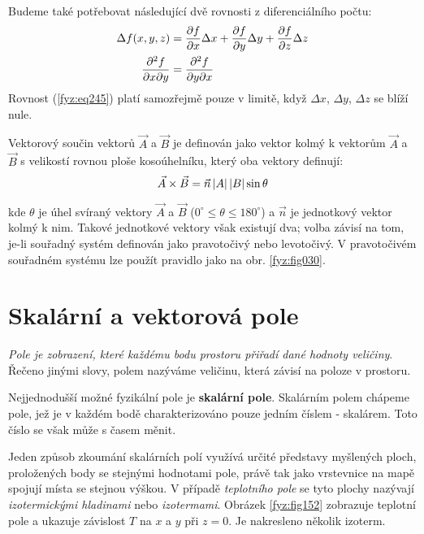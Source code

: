     Budeme také potřebovat následující dvě rovnosti z dife\-ren\-ci\-ál\-ní\-ho počtu:
    \begin{subequations} 
      \begin{align} 
        \Delta f(x,y,z)                      
          &=  \dfrac{\partial f}{\partial x}\Delta x +
              \dfrac{\partial f}{\partial y}\Delta y + 
              \dfrac{\partial f}{\partial z}\Delta z                     \label{fyz:eq245}        \\
        \frac{\partial^2f}{\partial x\partial y}
          &=\frac{\partial^2f}{\partial y\partial x}  \label{fyz:eq246}
      \end{align}
    \end{subequations}
    Rovnost (\ref{fyz:eq245}) platí samozřejmě pouze v limitě, když \(\Delta x\), \(\Delta 
    y\), \(\Delta z\) se blíží nule.
   
    Vektorový součin vektorů $\vec{A}$ a $\vec{B}$ je definován jako vektor kolmý k vektorům 
    $\vec{A}$ a $\vec{B}$ s velikostí rovnou ploše kosoúhelníku, který oba vektory definují:
    \begin{equation}\label{fyz:eq247}
      \vec{A}\times\vec{B} = \vec{n}\left\lvert A\right\rvert\left\lvert B\right\rvert\sin\theta
    \end{equation} 

    kde $\theta$ je úhel svíraný vektory $\vec{A}$ a $\vec{B}$ ($0^\circ\leq\theta\leq180^\circ$) a 
    $\vec{n}$ je jednotkový vektor kolmý k nim. Takové jednotkové vektory však existují dva; volba 
    závisí na tom, je-li souřadný systém definován jako pravotočivý nebo levotočivý. V pravotočivém 
    souřadném systému lze použít pravidlo jako na obr. \ref{fyz:fig030}.
      
    \section{Skalární a vektorová pole}
      \emph{Pole je zobrazení, které každému bodu prostoru přiřadí dané hodnoty veličiny}. Řečeno 
      jinými slovy, polem nazýváme veličinu, která závisí na poloze v prostoru.
      
      Nejjednodušší možné fyzikální pole je \textbf{ska\-lá\-rní pole}. Skalárním polem chápeme 
      pole, jež je v každém bodě charakterizováno pouze jedním číslem - skalárem. Toto číslo se 
      však může s časem měnit.
      
      Jeden způsob zkoumání skalár\-ních polí využívá určité představy myšle\-ných ploch, 
      pro\-ložených body se stejnými hodnotami pole, právě tak jako vrstevnice na mapě spojují 
      místa se stejnou výškou. V případě \emph{teplotního pole} se tyto plochy nazývají 
      \emph{izotermickými hladinami} nebo \emph{izotermami}. Obrázek \ref{fyz:fig152} zobrazuje 
      teplotní pole a ukazuje závislost \(T\) na \(x\) a \(y\) při \(z = 0\). Je nakresleno několik 
      izoterm.

